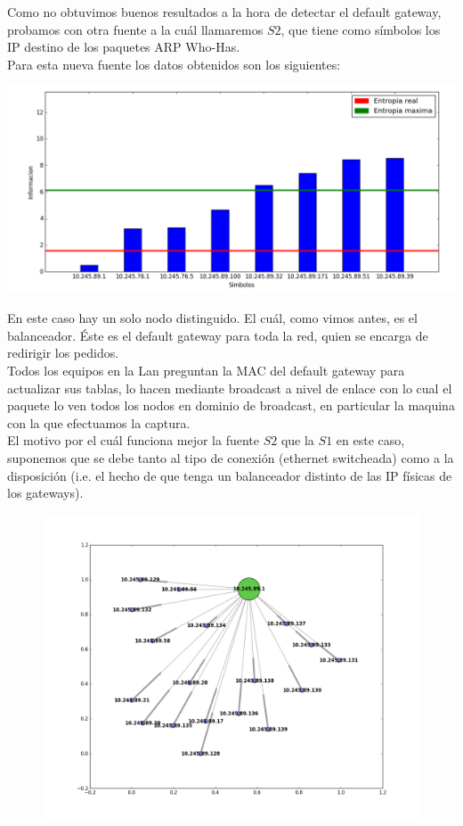 Como no obtuvimos buenos resultados a la hora de detectar el default gateway, probamos con otra fuente a la cuál llamaremos $S2$, que tiene como símbolos los IP destino de los paquetes ARP Who-Has.\\

Para esta nueva fuente los datos obtenidos son los siguientes:
\begin{center}
\includegraphics[scale=0.5]{imagenes/analisisTCORPcableada/fuenteS1-12.png} 
\end{center}

En este caso hay un solo nodo distinguido. El cuál, como vimos antes, es el balanceador. Éste es el default gateway para toda la red, quien se encarga de redirigir los pedidos.\\

Todos los equipos en la Lan preguntan la MAC del default gateway para actualizar sus tablas, lo hacen mediante broadcast a nivel de enlace con lo cual el paquete lo ven todos los nodos en dominio de broadcast, en particular la maquina con la que efectuamos la captura.\\

El motivo por el cuál funciona mejor la fuente $S2$ que la $S1$ en este caso, suponemos que se debe tanto al tipo de conexión (ethernet switcheada) como a la disposición (i.e. el hecho de que tenga un balanceador distinto de las IP físicas de los gateways).

\begin{figure}[htbp]
\hspace*{-2cm}                                                           
\includegraphics[scale=0.6]{imagenes/analisisTCORPcableada/cableada-12.png} 
\end{figure}







